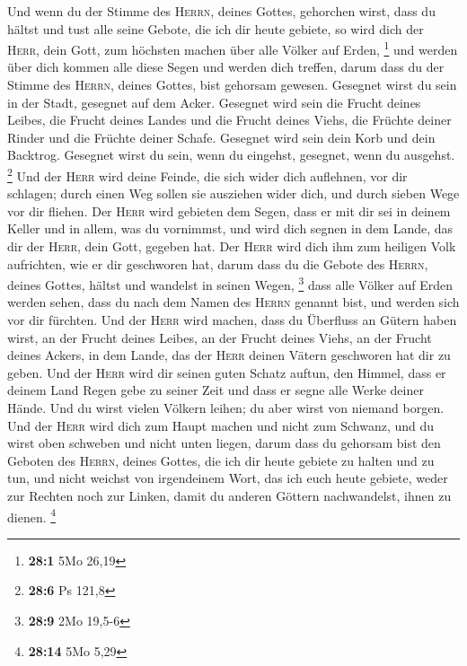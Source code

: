  Und wenn du der Stimme des \textsc{Herrn}, deines Gottes,
gehorchen wirst, dass du hältst und tust alle seine Gebote, die ich dir
heute gebiete, so wird dich der \textsc{Herr}, dein Gott, zum höchsten
machen über alle Völker auf Erden, \footnote{\textbf{28:1} 5Mo 26,19}
 und werden über dich kommen alle diese Segen und werden
dich treffen, darum dass du der Stimme des \textsc{Herrn}, deines
Gottes, bist gehorsam gewesen.  Gesegnet wirst du sein in
der Stadt, gesegnet auf dem Acker.  Gesegnet wird sein die
Frucht deines Leibes, die Frucht deines Landes und die Frucht deines
Viehs, die Früchte deiner Rinder und die Früchte deiner Schafe.
 Gesegnet wird sein dein Korb und dein Backtrog.
 Gesegnet wirst du sein, wenn du eingehst, gesegnet, wenn
du ausgehst. \footnote{\textbf{28:6} Ps 121,8}  Und der
\textsc{Herr} wird deine Feinde, die sich wider dich auflehnen, vor dir
schlagen; durch einen Weg sollen sie ausziehen wider dich, und durch
sieben Wege vor dir fliehen.  Der \textsc{Herr} wird
gebieten dem Segen, dass er mit dir sei in deinem Keller und in allem,
was du vornimmst, und wird dich segnen in dem Lande, das dir der
\textsc{Herr}, dein Gott, gegeben hat.  Der \textsc{Herr}
wird dich ihm zum heiligen Volk aufrichten, wie er dir geschworen hat,
darum dass du die Gebote des \textsc{Herrn}, deines Gottes, hältst und
wandelst in seinen Wegen, \footnote{\textbf{28:9} 2Mo 19,5-6}
 dass alle Völker auf Erden werden sehen, dass du nach
dem Namen des \textsc{Herrn} genannt bist, und werden sich vor dir
fürchten.  Und der \textsc{Herr} wird machen, dass du
Überfluss an Gütern haben wirst, an der Frucht deines Leibes, an der
Frucht deines Viehs, an der Frucht deines Ackers, in dem Lande, das der
\textsc{Herr} deinen Vätern geschworen hat dir zu geben. 
Und der \textsc{Herr} wird dir seinen guten Schatz auftun, den Himmel,
dass er deinem Land Regen gebe zu seiner Zeit und dass er segne alle
Werke deiner Hände. Und du wirst vielen Völkern leihen; du aber wirst
von niemand borgen.  Und der \textsc{Herr} wird dich zum
Haupt machen und nicht zum Schwanz, und du wirst oben schweben und nicht
unten liegen, darum dass du gehorsam bist den Geboten des
\textsc{Herrn}, deines Gottes, die ich dir heute gebiete zu halten und
zu tun,  und nicht weichst von irgendeinem Wort, das ich
euch heute gebiete, weder zur Rechten noch zur Linken, damit du anderen
Göttern nachwandelst, ihnen zu dienen. \footnote{\textbf{28:14} 5Mo 5,29}
